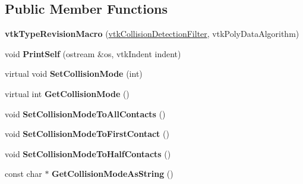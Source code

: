 \subsection*{Public Member Functions}
\begin{DoxyCompactItemize}
\item 
\hypertarget{classvtkCollisionDetectionFilter_ac9eeeaed9c8ea326518b32f85e9f4f40}{
{\bfseries vtkTypeRevisionMacro} (\hyperlink{classvtkCollisionDetectionFilter}{vtkCollisionDetectionFilter}, vtkPolyDataAlgorithm)}
\label{classvtkCollisionDetectionFilter_ac9eeeaed9c8ea326518b32f85e9f4f40}

\item 
\hypertarget{classvtkCollisionDetectionFilter_ab71ccf77152396e086bd057fe8c4d5c1}{
void {\bfseries PrintSelf} (ostream \&os, vtkIndent indent)}
\label{classvtkCollisionDetectionFilter_ab71ccf77152396e086bd057fe8c4d5c1}

\item 
\hypertarget{classvtkCollisionDetectionFilter_af310f9312cd84f971a8a7a77f1f2d1eb}{
virtual void {\bfseries SetCollisionMode} (int)}
\label{classvtkCollisionDetectionFilter_af310f9312cd84f971a8a7a77f1f2d1eb}

\item 
\hypertarget{classvtkCollisionDetectionFilter_ab3604902b690000f51e2bf77a2d0fa44}{
virtual int {\bfseries GetCollisionMode} ()}
\label{classvtkCollisionDetectionFilter_ab3604902b690000f51e2bf77a2d0fa44}

\item 
\hypertarget{classvtkCollisionDetectionFilter_ad19501102466ba8e82932bfa0d348e4d}{
void {\bfseries SetCollisionModeToAllContacts} ()}
\label{classvtkCollisionDetectionFilter_ad19501102466ba8e82932bfa0d348e4d}

\item 
\hypertarget{classvtkCollisionDetectionFilter_a248069cda68f8dc5ce95d9d756aa74f4}{
void {\bfseries SetCollisionModeToFirstContact} ()}
\label{classvtkCollisionDetectionFilter_a248069cda68f8dc5ce95d9d756aa74f4}

\item 
\hypertarget{classvtkCollisionDetectionFilter_a932c19078b9d200585cb037e752e2f4c}{
void {\bfseries SetCollisionModeToHalfContacts} ()}
\label{classvtkCollisionDetectionFilter_a932c19078b9d200585cb037e752e2f4c}

\item 
\hypertarget{classvtkCollisionDetectionFilter_abc0c111f63fa38cdeb5bd07f64c9c9c4}{
const char $\ast$ {\bfseries GetCollisionModeAsString} ()}
\label{classvtkCollisionDetectionFilter_abc0c111f63fa38cdeb5bd07f64c9c9c4}


\end{DoxyCompactItemize}
